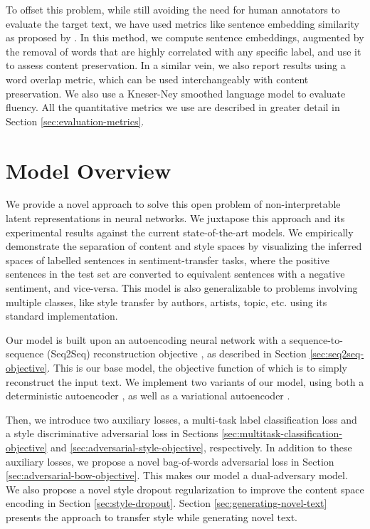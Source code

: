 To offset this problem, while still avoiding the need for human annotators to evaluate the target text, we have used metrics like sentence embedding similarity as proposed by \cite{fu2017style}. In this method, we compute sentence embeddings, augmented by the removal of words that are highly correlated with any specific label, and use it to assess content preservation. In a similar vein, we also report results using a word overlap metric, which can be used interchangeably with content preservation. We also use a Kneser-Ney smoothed \citep{kneser1995improved} language model to evaluate fluency. All the quantitative metrics we use are described in greater detail in Section \ref{sec:evaluation-metrics}.


\section{Model Overview}

We provide a novel approach to solve this open problem of non-interpretable latent representations in neural networks. We juxtapose this approach and its experimental results against the current state-of-the-art models. We empirically demonstrate the separation of content and style spaces by visualizing the inferred spaces of labelled sentences in sentiment-transfer tasks, where the positive sentences in the test set are converted to equivalent sentences with a negative sentiment, and vice-versa. This model is also generalizable to problems involving multiple classes, like style transfer by authors, artists, topic, etc. using its standard implementation.

Our model is built upon an autoencoding neural network with a sequence-to-sequence (Seq2Seq) reconstruction objective \citep{sutskever2014sequence}, as described in Section \ref{sec:seq2seq-objective}. This is our base model, the objective function of which is to simply reconstruct the input text. We implement two variants of our model, using both a deterministic autoencoder \citep{baldi2012autoencoders}, as well as a variational autoencoder \citep{kingma2013auto}.

Then, we introduce two auxiliary losses, a multi-task label classification loss and a style discriminative adversarial loss in Sections \ref{sec:multitask-classification-objective} and \ref{sec:adversarial-style-objective}, respectively. In addition to these auxiliary losses, we propose a novel bag-of-words adversarial loss in Section \ref{sec:adversarial-bow-objective}. This makes our model a dual-adversary model. We also propose a novel style dropout regularization to improve the content space encoding in Section \ref{sec:style-dropout}. Section \ref{sec:generating-novel-text} presents the approach to transfer style while generating novel text.

